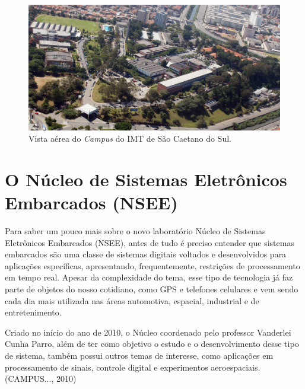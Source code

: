 \documentclass[
	12pt,				%
	openright,			%
	twoside,			%
	a4paper,			%
	english,			%
	french,				%
	spanish,			%
	brazil				%
	]{abntex2}
\let\svthefootnote\thefootnote
\begin{document}
\let\thefootnote\svthefootnote

\begin{figure}[!htb]
	\centering
	\includegraphics[scale = 1]{Imagens/Campus_IMT_foto_aerea.jpg}
	\caption{Vista aérea do \textit{Campus} do IMT de São Caetano do Sul.}
	\label{IMT}
\end{figure}


\section{O Núcleo de Sistemas Eletrônicos Embarcados (NSEE)}
Para saber um pouco mais sobre o novo laboratório Núcleo de Sistemas Eletrônicos Embarcados (NSEE), antes de tudo é preciso entender que sistemas embarcados são uma classe de sistemas digitais voltados e desenvolvidos para aplicações específicas, apresentando, frequentemente, restrições de processamento em tempo real. Apesar da complexidade do tema, esse tipo de tecnologia já faz parte de objetos do nosso cotidiano, como GPS e telefones celulares e vem sendo cada dia mais utilizada nas áreas automotiva, espacial, industrial e de entretenimento.

Criado no início do ano de 2010, o Núcleo coordenado pelo professor Vanderlei Cunha Parro, além de ter como objetivo o estudo e o desenvolvimento desse tipo de sistema, também possui outros temas de interesse, como aplicações em processamento de sinais, controle digital e experimentos aeroespaciais.(\uppercase{Campus...}, 2010) \let\thefootnote\relax{}




\end{document}

